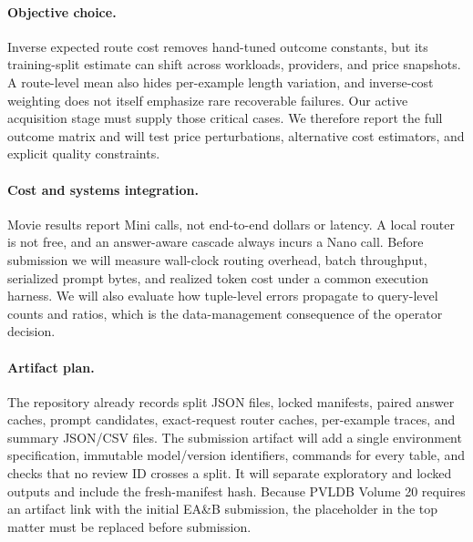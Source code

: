 \paragraph{Objective choice.}
Inverse expected route cost removes hand-tuned outcome constants, but its
training-split estimate can shift across workloads, providers, and price
snapshots. A route-level mean also hides per-example length variation, and
inverse-cost weighting does not itself emphasize rare recoverable failures.
Our active acquisition stage must supply those critical cases. We therefore
report the full outcome matrix and will test price perturbations, alternative
cost estimators, and explicit quality constraints.

\paragraph{Cost and systems integration.}
Movie results report Mini calls, not end-to-end dollars or latency. A local
router is not free, and an answer-aware cascade always incurs a Nano call.
Before submission we will measure wall-clock routing overhead, batch
throughput, serialized prompt bytes, and realized token cost under a common
execution harness. We will also evaluate how tuple-level errors propagate to
query-level counts and ratios, which is the data-management consequence of the
operator decision.

\paragraph{Artifact plan.}
The repository already records split JSON files, locked manifests, paired
answer caches, prompt candidates, exact-request router caches, per-example
traces, and summary JSON/CSV files. The submission artifact will add a single
environment specification, immutable model/version identifiers, commands for
every table, and checks that no review ID crosses a split. It will separate
exploratory and locked outputs and include the fresh-manifest hash. Because
PVLDB Volume 20 requires an artifact link with the initial EA\&B submission,
the placeholder in the top matter must be replaced before submission.
